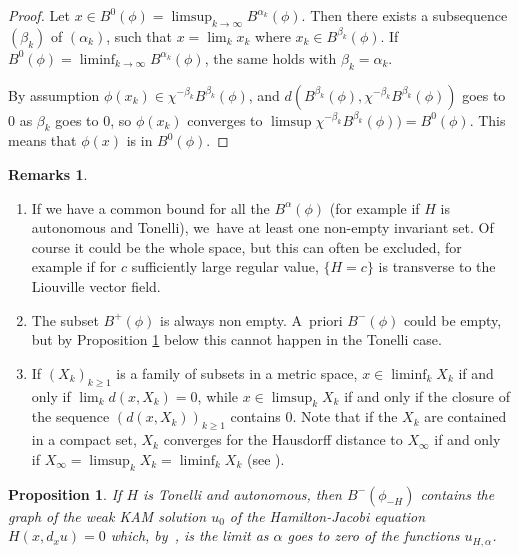 \documentclass[10pt]{amsart}
\newtheorem{prop}[thm]{Proposition}
\theoremstyle{definition}
\newtheorem{rems}[thm]{Remarks}
\providecommand{\skpt}{\par\smallskip\noindent}
\begin{document}
\begin{proof}
Let $x\in B_{}^0(\phi)=\limsup_{k\to\infty}B^{\alpha_k}(\phi)$.
Then there exists a subsequence $(\beta_k)$ of $(\alpha_k)$, such that $x=\lim_kx_k$ where $x_k\in B_{}^{\beta_k}(\phi)$. If~$B_{}^0(\phi)=\liminf_{k\to\infty}B^{\alpha_k}(\phi)$, the same holds with $\beta_k=\alpha_k$.

By assumption $\phi(x_k)\in \chi^{-\beta_k}B^{\beta_k}(\phi)$, and $d(B^{\beta_k}(\phi), \chi^{-\beta_k}B^{\beta_k}(\phi))$ goes to $0$ as $\beta_k$ goes to $0$, so $\phi(x_k)$ converges to $\limsup \chi^{-\beta_k}B^{\beta_k}(\phi))=B^0(\phi)$. This means that $\phi(x)$ is in $B^0(\phi)$.
\end{proof}

\skpt
\begin{rems}
\begin{enumerate}
\item If we have a common bound for all the $B^\alpha(\phi)$ (for example if $H$ is autonomous and Tonelli), we~have at least one non-empty invariant set. Of course it could be the whole space, but this can often be excluded, for example if for $c$ sufficiently large regular value, $\{H=c\}$ is transverse to the Liouville vector field.
\item The subset $B^+(\phi)$ is always non empty. A~priori $B^-(\phi)$ could be empty, but by Proposition \ref{prop:weakKAM-non-discounted} below this cannot happen in the Tonelli case.
\item If $(X_k)_{k\geq 1}$ is a family of subsets in a metric space, $x\in \liminf_k X_k$ if and only if $\lim_k d(x,X_k)=0$,
while $x\in \limsup_k X_k$ if and only if the closure of the sequence $(d(x,X_k))_{k\geq 1}$ contains $0$.
Note that if the $X_k$ are contained in a compact set, $X_k$ converges for the Hausdorff distance to $X_\infty$ if and only if $X_\infty=\limsup_k X_k=\liminf_k X_k$ (see \cite[pp.\,25-26]{Kechris}).
\end{enumerate}
\end{rems}

\begin{prop}\label{prop:weakKAM-non-discounted} If $H$ is Tonelli and autonomous, then $B^-(\phi_{-H})$ contains the graph of the weak KAM solution $u_0$ of the Hamilton-Jacobi equation $H(x,d_xu)=0$ which, by~\cite{DFIZ}, is the limit as $\alpha$ goes to zero of the functions $u_{H,\alpha}$.
\end{prop}
\end{document}
